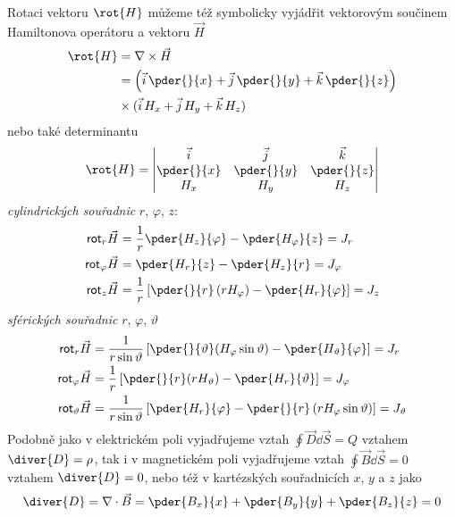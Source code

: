       Rotaci vektoru $\rot{H}$ můžeme též symbolicky vyjádřit vektorovým součinem Hamiltonova
      operátoru a vektoru $\vec{H}$
      \begin{align*}
        \rot{H} &= \nabla\times\vec{H}                                                      \\                                           
                &= \left(\vec{i}\,\pder{ }{x} + 
                   \vec{j}\,\pder{ }{y} + \vec{k}\,\pder{ }{z}\right)                       \\
                & \times(\vec{i}\,H_x + \vec{j}\,H_y + \vec{k}\,H_z)
      \end{align*}
      nebo také determinantu
      \begin{equation}\label{TEMP:eq_amp_z8}
        \rot{H} = \begin{vmatrix}
                    \vec{i}       & \vec{j}      & \vec{k}      \\
                    \pder{ }{x}  & \pder{ }{y} & \pder{ }{z} \\ 
                    H_x          & H_y         & H_z         \\
                  \end{vmatrix}      
      \end{equation}  
      \emph{cylindrických souřadnic} $r$, $\varphi$, $z$:
      \begin{align}\label{TEMP:eq_amp_z9}
        \textsf{rot}_r\vec{H}       
          &= \frac{1}{r}\pder{H_z}{\varphi} - \pder{H_\varphi}{z} = J_r           \nonumber \\ 
        \textsf{rot}_\varphi\vec{H} 
          &= \pder{H_r}{z} - \pder{H_z}{r}                        = J_\varphi     \nonumber \\
        \textsf{rot}_z\vec{H}       
          &= \frac{1}{r}\left[\pder{ }{r}
             \left(rH_\varphi\right)-\pder{H_r}{\varphi}\right]   = J_z
      \end{align} 
      \emph{sférických souřadnic} $r$, $\varphi$, $\vartheta$ 
      \begin{align}\label{TEMP:eq_amp_z10}
        \textsf{rot}_r\vec{H}        
           &= \frac{1}{r\sin\vartheta}\left[\pder{ }{\vartheta}(H_\varphi\sin\vartheta) - 
              \pder{H_\vartheta}{\varphi}\right]                     = J_r           \nonumber \\ 
        \textsf{rot}_\varphi\vec{H}   
           &= \frac{1}{r}\left[\pder{ }{r}(rH_\vartheta) - 
              \pder{H_r}{\vartheta}\right]                           = J_\varphi     \nonumber \\
        \textsf{rot}_\vartheta\vec{H} 
           &= \frac{1}{r\sin\vartheta}\left[\pder{H_r}{\varphi} -
              \pder{ }{r}\left(rH_\varphi\sin\vartheta\right)\right] = J_\vartheta    
    \end{align} 
      Podobně jako v elektrickém poli vyjadřujeme vztah $\oint\vec{D}\dd{\vec{S}} = Q$ vztahem 
      $\diver{D}
      = \rho$, tak i v magnetickém poli vyjadřujeme vztah $\oint\vec{B}\dd{\vec{S}} = 0$ vztahem
      $\diver{D} = 0$, nebo též v kartézských souřadnicích \(x\), \(y\) a $z$ jako $$\diver{D} =
      \nabla\cdot\vec{B} = \pder{B_x}{x} + \pder{B_y}{y} + \pder{B_z}{z} = 0$$
                     
